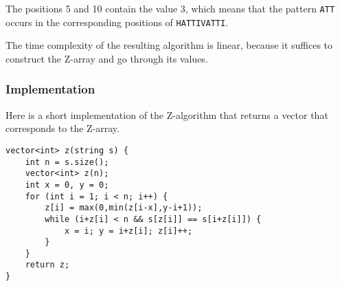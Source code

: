 The positions 5 and 10 contain the value 3,
which means that the pattern \texttt{ATT}
occurs in the corresponding positions
of \texttt{HATTIVATTI}.

The time complexity of the resulting algorithm
is linear, because it suffices to construct
the Z-array and go through its values.

\subsubsection{Implementation}

Here is a short implementation of the Z-algorithm
that returns a vector that corresponds to the Z-array.

\begin{lstlisting}
vector<int> z(string s) {
    int n = s.size();
    vector<int> z(n);
    int x = 0, y = 0;
    for (int i = 1; i < n; i++) {
        z[i] = max(0,min(z[i-x],y-i+1));
        while (i+z[i] < n && s[z[i]] == s[i+z[i]]) {
            x = i; y = i+z[i]; z[i]++;
        }
    }
    return z;
}
\end{lstlisting}